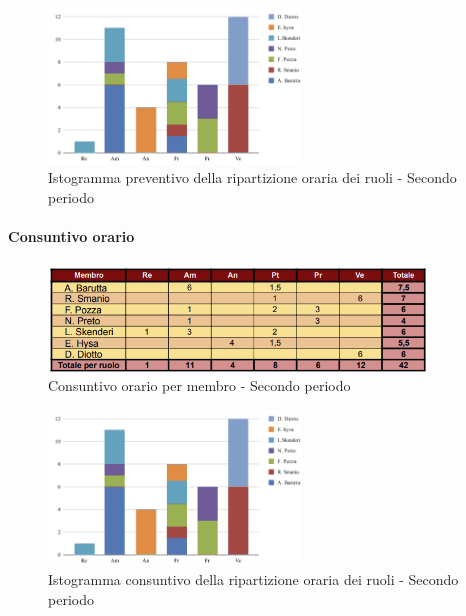 \vspace{0.6cm}

\begin{figure}[H]
    \centering
    \includegraphics[width=0.6\textwidth]{../Images/graficoConsPrev2.png}
    \caption{Istogramma preventivo della ripartizione oraria dei ruoli - Secondo periodo}
    \label{fig:Preventivo_ripartizione_oraria_2}
\end{figure}

\paragraph{Consuntivo orario } 

\begin{figure}[H]
    \centering
    \includegraphics[width=0.9\textwidth]{../Images/tabCons2.png}
    \caption{Consuntivo orario per membro - Secondo periodo}
    \label{fig:Constuntivo_orario_2}
\end{figure}

\vspace{0.6cm}

\begin{figure}[H]
    \centering
    \includegraphics[width=0.6\textwidth]{../Images/graficoConsPrev2.png}
    \caption{Istogramma consuntivo della ripartizione oraria dei ruoli - Secondo periodo}
    \label{fig:Consuntivo_ripartizione_oraria_2}
\end{figure}


